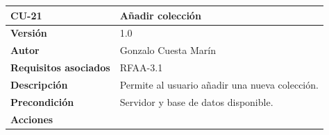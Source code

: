 \documentclass[
]{article}
\begin{document}
\begin{longtable}[]{@{}ll@{}}
\toprule
\begin{minipage}[b]{0.18\columnwidth}\raggedright
\textbf{CU-21}\strut
\end{minipage} & \begin{minipage}[b]{0.76\columnwidth}\raggedright
\textbf{Añadir colección}\strut
\end{minipage}\tabularnewline
\midrule
\endhead
\begin{minipage}[t]{0.18\columnwidth}\raggedright
\textbf{Versión}\strut
\end{minipage} & \begin{minipage}[t]{0.76\columnwidth}\raggedright
1.0\strut
\end{minipage}\tabularnewline
\begin{minipage}[t]{0.18\columnwidth}\raggedright
\textbf{Autor}\strut
\end{minipage} & \begin{minipage}[t]{0.76\columnwidth}\raggedright
Gonzalo Cuesta Marín\strut
\end{minipage}\tabularnewline
\begin{minipage}[t]{0.18\columnwidth}\raggedright
\textbf{Requisitos asociados}\strut
\end{minipage} & \begin{minipage}[t]{0.76\columnwidth}\raggedright
RFAA-3.1\strut
\end{minipage}\tabularnewline
\begin{minipage}[t]{0.18\columnwidth}\raggedright
\textbf{Descripción}\strut
\end{minipage} & \begin{minipage}[t]{0.76\columnwidth}\raggedright
Permite al usuario añadir una nueva colección.\strut
\end{minipage}\tabularnewline
\begin{minipage}[t]{0.18\columnwidth}\raggedright
\textbf{Precondición}\strut
\end{minipage} & \begin{minipage}[t]{0.76\columnwidth}\raggedright
Servidor y base de datos disponible.\strut
\end{minipage}\tabularnewline
\begin{minipage}[t]{0.18\columnwidth}\raggedright
\textbf{Acciones}\strut
\end{minipage} & \begin{minipage}[t]{0.76\columnwidth}\raggedright
\begin{enumerate}
\def\labelenumi{\arabic{enumi}.}

\end{enumerate}
\end{minipage}
\end{longtable}
\end{document}
